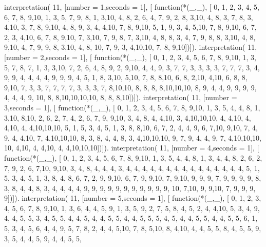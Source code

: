 interpretation( 11, [number = 1,seconds = 1], [
    function(*(_,_), [
         0, 1, 2, 3, 4, 5, 6, 7, 8, 9,10,
         1, 3, 5, 7, 9, 8, 1, 3,10, 4, 8,
         2, 6, 4, 7, 9, 2, 8, 3,10, 4, 8,
         3, 7, 8, 3, 4,10, 3, 7, 8, 9,10,
         4, 8, 9, 3, 4, 4,10, 7, 8, 9,10,
         5, 1, 9, 3, 4, 5,10, 7, 8, 9,10,
         6, 7, 2, 3, 4,10, 6, 7, 8, 9,10,
         7, 3,10, 7, 9, 8, 7, 3,10, 4, 8,
         8, 3, 4, 7, 9, 8, 8, 3,10, 4, 8,
         9,10, 4, 7, 9, 9, 8, 3,10, 4, 8,
        10, 7, 9, 3, 4,10,10, 7, 8, 9,10])]).
interpretation( 11, [number = 2,seconds = 1], [
    function(*(_,_), [
         0, 1, 2, 3, 4, 5, 6, 7, 8, 9,10,
         1, 3, 5, 7, 8, 7, 1, 3, 3,10, 7,
         2, 6, 4, 8, 9, 2, 9,10, 4, 4, 9,
         3, 7, 7, 3, 3, 3, 3, 7, 7, 7, 3,
         4, 9, 9, 4, 4, 4, 4, 9, 9, 9, 4,
         5, 1, 8, 3,10, 5,10, 7, 8, 8,10,
         6, 8, 2,10, 4,10, 6, 8, 8, 9,10,
         7, 3, 3, 7, 7, 7, 7, 3, 3, 3, 7,
         8,10,10, 8, 8, 8, 8,10,10,10, 8,
         9, 4, 4, 9, 9, 9, 9, 4, 4, 4, 9,
        10, 8, 8,10,10,10,10, 8, 8, 8,10])]).
interpretation( 11, [number = 3,seconds = 1], [
    function(*(_,_), [
         0, 1, 2, 3, 4, 5, 6, 7, 8, 9,10,
         1, 3, 5, 4, 4, 8, 1, 3,10, 8,10,
         2, 6, 2, 7, 4, 2, 6, 7, 9, 9,10,
         3, 4, 8, 4, 4,10, 3, 4,10,10,10,
         4, 4,10, 4, 4,10, 4, 4,10,10,10,
         5, 1, 5, 3, 4, 5, 1, 3, 8, 8,10,
         6, 7, 2, 4, 4, 9, 6, 7,10, 9,10,
         7, 4, 9, 4, 4,10, 7, 4,10,10,10,
         8, 3, 8, 4, 4, 8, 3, 4,10,10,10,
         9, 7, 9, 4, 4, 9, 7, 4,10,10,10,
        10, 4,10, 4, 4,10, 4, 4,10,10,10])]).
interpretation( 11, [number = 4,seconds = 1], [
    function(*(_,_), [
         0, 1, 2, 3, 4, 5, 6, 7, 8, 9,10,
         1, 3, 5, 4, 4, 8, 1, 3, 4, 4, 8,
         2, 6, 2, 7, 9, 2, 6, 7,10, 9,10,
         3, 4, 8, 4, 4, 4, 3, 4, 4, 4, 4,
         4, 4, 4, 4, 4, 4, 4, 4, 4, 4, 4,
         5, 1, 5, 3, 4, 5, 1, 3, 8, 4, 8,
         6, 7, 2, 9, 9,10, 6, 7, 9, 9,10,
         7, 9,10, 9, 9, 9, 7, 9, 9, 9, 9,
         8, 3, 8, 4, 4, 8, 3, 4, 4, 4, 4,
         9, 9, 9, 9, 9, 9, 9, 9, 9, 9, 9,
        10, 7,10, 9, 9,10, 7, 9, 9, 9, 9])]).
interpretation( 11, [number = 5,seconds = 1], [
    function(*(_,_), [
         0, 1, 2, 3, 4, 5, 6, 7, 8, 9,10,
         1, 3, 6, 4, 4, 5, 9, 1, 3, 5, 9,
         2, 7, 5, 8, 4, 5, 2, 4, 4,10, 5,
         3, 4, 9, 4, 4, 5, 5, 3, 4, 5, 5,
         4, 4, 5, 4, 4, 5, 5, 4, 4, 5, 5,
         5, 4, 5, 4, 4, 5, 5, 4, 4, 5, 5,
         6, 1, 5, 3, 4, 5, 6, 4, 4, 9, 5,
         7, 8, 2, 4, 4, 5,10, 7, 8, 5,10,
         8, 4,10, 4, 4, 5, 5, 8, 4, 5, 5,
         9, 3, 5, 4, 4, 5, 9, 4, 4, 5, 5,
